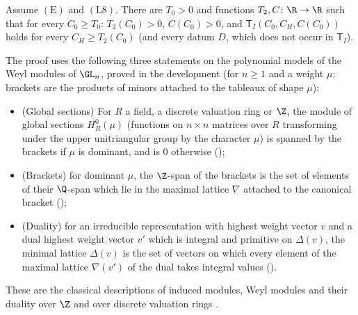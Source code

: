 \begin{theorem}\label{pf:sh-curv:firstthm}
Assume $(\mathrm E)$ and $(\mathrm L8)$. There are $T_0>0$ and functions $T_2,C\colon\R\to\R$ such that for every $C_0\ge
T_0$: $T_2(C_0)>0$, $C(C_0)>0$, and $\mathsf T_I(C_0,C_H,C(C_0))$ holds for every $C_H\ge T_2(C_0)$ (and every datum $D$,
which does not occur in $\mathsf T_I$).
\end{theorem}

The proof uses the following three statements on the polynomial models of the Weyl modules of $\GL_n$, proved in the
development (for $n\ge1$ and a weight $\mu$; brackets are the products of minors attached to the tableaux of shape $\mu$):
\begin{itemize}
\item (Global sections) For $R$ a field, a discrete valuation ring or $\Z$, the module of global sections $H^0_R(\mu)$ (functions
on $n\times n$ matrices over $R$ transforming under the upper unitriangular group by the character $\mu$) is spanned by the
brackets if $\mu$ is dominant, and is $0$ otherwise ();
\item (Brackets) for dominant $\mu$, the $\Z$-span of the brackets is the set of elements of their $\Q$-span which lie in the
maximal lattice $\nabla$ attached to the canonical bracket
();
\item (Duality) for an irreducible representation with highest weight vector $v$ and a dual highest weight vector $v'$
which is integral and primitive on $\Delta(v)$, the minimal lattice $\Delta(v)$ is the set of vectors on which every element
of the maximal lattice $\nabla(v')$ of the dual takes integral values
().
\end{itemize}
These are the classical descriptions of induced modules, Weyl modules and their duality over $\Z$ and over discrete
valuation rings \cite[II.2--II.4]{Jantzen2003}.

